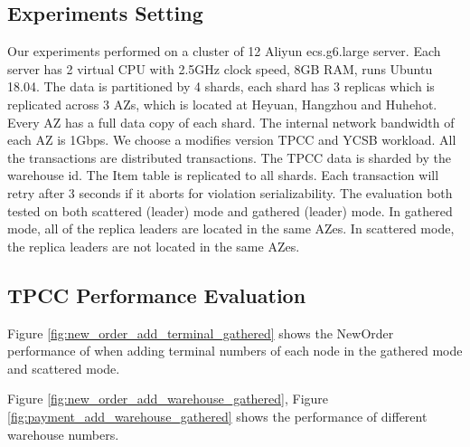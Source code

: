 \documentclass[conference]{IEEEtran}
\begin{document}
\subsection{Experiments Setting}
Our experiments performed on a cluster of 12 Aliyun ecs.g6.large server.
Each server has 2 virtual CPU with 2.5GHz clock speed, 8GB RAM, runs Ubuntu 18.04.
The data is partitioned by 4 shards, each shard has 3 replicas which is replicated across 3 AZs, which is located at Heyuan, Hangzhou and Huhehot.
Every AZ has a full data copy of each shard.
The internal network bandwidth of each AZ is 1Gbps.
We choose a modifies version TPCC and YCSB workload.
All the transactions are distributed transactions.
The TPCC data is sharded by the warehouse id.
The Item table is replicated to all shards.
Each transaction will retry after 3 seconds if it aborts for violation serializability.
The evaluation both tested on both scattered (leader) mode and gathered (leader) mode.
In gathered mode, all of the replica leaders are located in the same AZes.
In scattered mode, the replica leaders are not located in the same AZes.

\subsection{TPCC Performance Evaluation}
Figure \ref{fig:new_order_add_terminal_gathered} shows the NewOrder performance of when adding terminal numbers of each node in the gathered  mode and scattered mode.

Figure \ref{fig:new_order_add_warehouse_gathered},
Figure \ref{fig:payment_add_warehouse_gathered} shows
the performance of different warehouse numbers.
\end{document}
